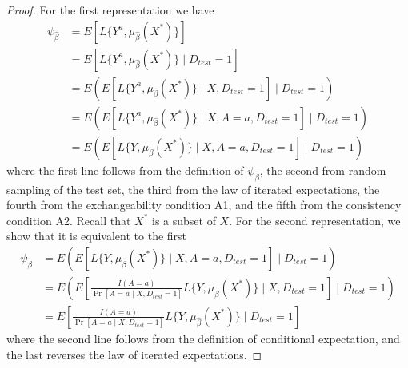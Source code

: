     \begin{proof}
        For the first representation we have 
        \begin{align*}
            \psi_{\widehat{\beta}} &= E[L\{Y^{a}, \mu_{\widehat{\beta}}(X^*)\}] \\
            & = E[L\{Y^{a}, \mu_{\widehat{\beta}}(X^*)\}\mid D_{test} = 1] \\
            & = E(E[L\{Y^{a}, \mu_{\widehat{\beta}}(X^*)\}\mid X, D_{test} = 1] \mid D_{test} = 1) \\
            & = E(E[L\{Y^{a}, \mu_{\widehat{\beta}}(X^*)\}\mid X, A = a, D_{test} = 1] \mid D_{test} = 1) \\
            & = E(E[L\{Y, \mu_{\widehat{\beta}}(X^*)\}\mid X, A = a, D_{test} = 1] \mid D_{test} = 1) 
        \end{align*}
        where the first line follows from the definition of $\psi_{\widehat{\beta}}$, the second from random sampling of the test set, the third from the law of iterated expectations, the fourth from the exchangeability condition A1, and the fifth from the consistency condition A2. Recall that $X^*$ is a subset of $X$. For the second representation, we show that it is equivalent to the first 
        \begin{align*}
            \psi_{\widehat{\beta}} &= E(E[L\{Y, \mu_{\widehat{\beta}}(X^*)\}\mid X,A = a, D_{test} = 1] \mid D_{test} = 1) \\
            &= E\left(E\left[\frac{I(A = a)}{\Pr[A = a \mid X,D_{test} = 1]}L\{Y, \mu_{\widehat{\beta}}(X^*)\} \mid X,D_{test} = 1\right] \mid D_{test} = 1\right)\\
            &= E\left[\frac{I(A = a)}{\Pr[A = a \mid X,D_{test} = 1]}L\{Y, \mu_{\widehat{\beta}}(X^*)\} \mid D_{test} = 1\right]
        \end{align*}
        where the second line follows from the definition of conditional expectation, and the last reverses the law of iterated expectations.
    \end{proof}
    
